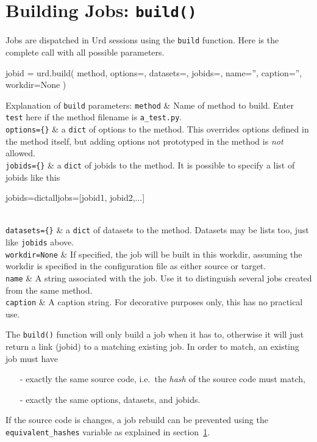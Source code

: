 \section{Building Jobs: \texttt{build()}}

Jobs are dispatched in Urd sessions using the \texttt{build} function.
Here is the complete call with all possible parameters.
\begin{python}
jobid = urd.build(
    method,
    options={},    datasets={},    jobids={},
    name='',       caption='',
    workdir=None
)
\end{python}
Explanation of \texttt{build} parameters:
\starttabletwo
\RPtwo \texttt{method} & Name of method to build.  Enter \texttt{test}
    here if the method filename is \texttt{a\_test.py}.\\[2ex]
    
\RPtwo \texttt{options=\{\}} & a \texttt{dict} of options to the method.
    This overrides options defined in the method itself, but adding
    options not prototyped in the method is \textsl{not} allowed.\\[2ex]

\RPtwo \texttt{jobids=\{\}} & a \texttt{dict} of jobids to the method.
    It is possible to specify a list of jobids like this
\begin{python}
jobids=dict{alljobs=[jobid1, jobid2,...]}
\end{python}
\\[0ex]

\RPtwo \texttt{datasets=\{\}} & a \texttt{dict} of datasets to the method.
    Datasets may be lists too, just like \texttt{jobids} above.\\[2ex]

\RPtwo \texttt{workdir=None} & If specified, the job will be built in
    this workdir, assuming the workdir is specified in the
    configuration file as either source or target.\\[2ex]

\RPtwo \texttt{name} & A string associated with the job.  Use it
    to distinguish several jobs created from the same method.\\[2ex]
    \texttt{caption} & A caption string.  For decorative purposes
    only, this has no practical use.
\stoptabletwo

The \texttt{build()} function will only build a job when it has to,
otherwise it will just return a link (jobid) to a matching existing
job.  In order to match, an existing job must have
\begin{itemize}
\item[-] exactly the same source code, i.e.\ the \textsl{hash} of the source code must match,
\item[-] exactly the same options, datasets, and jobids.
\end{itemize}
If the source code is changes, a job rebuild can be prevented using
the \texttt{equivalent\_hashes} variable as explained in
section~\ref{}.



